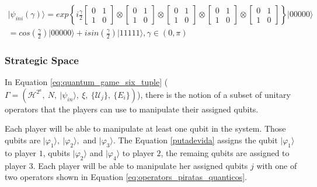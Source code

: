\begin{center}
\begin{equation}
\begin{split}
\vert\psi_{ini}(\gamma)\rangle=exp\left\{ i\frac{\gamma}{2}\left[\begin{array}{cc}
0 & 1\\
1 & 0
\end{array}\right]\otimes\left[\begin{array}{cc}
0 & 1\\
1 & 0
\end{array}\right]\otimes\left[\begin{array}{cc}
0 & 1\\
1 & 0
\end{array}\right]\otimes\left[\begin{array}{cc}
0 & 1\\
1 & 0
\end{array}\right]\otimes\left[\begin{array}{cc}
0 & 1\\
1 & 0
\end{array}\right]\right\} \vert00000\rangle \\
=cos(\frac{\gamma}{2})\vert00000\rangle+isin(\frac{\gamma}{2})\vert11111\rangle,\gamma\in(0,\pi)
\end{split}
\label{eq:estado_inicial_pg}
\end{equation}
\end{center}



\subsubsection{Strategic Space}
\label{subsec:strategic_space}

In Equation \ref{eq:quantum_game_six_tuple} ($\Gamma=(\mathcal{H}^{2^{a}},\: N,\:\vert\psi_{in}\rangle,\:\xi,\:\{\mathcal{U}_{j}\},\:\{E_{i}\})
$), there is the notion of a subset of unitary operators that the players can use to manipulate their assigned qubits. 

Each player will be able to manipulate at least one qubit in the system. Those qubits are $\vert\varphi_{1}\rangle,\:\vert\varphi_{2}\rangle,$ and $\vert\varphi_{3}\rangle$. The Equation \ref{putadevida} assigns the qubit $\vert\varphi_{1}\rangle$ to player $1$, qubits $\vert\varphi_{2}\rangle$ and $\vert\varphi_{4}\rangle$ to player $2$, the remaing qubits are assigned to player $3$. Each player will be able to manipulate her assigned qubits $j$ with one of two operators shown in Equation \ref{eq:operators_piratas_quanticos}. 

